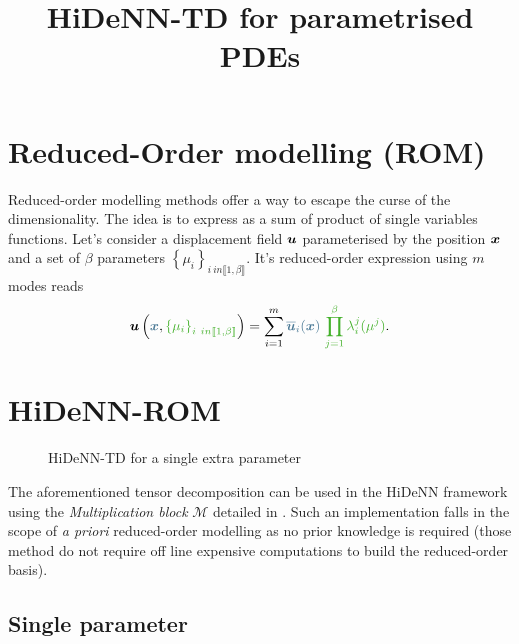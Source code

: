 \documentclass{article}
\author{}
\title{HiDeNN-TD for parametrised PDEs}
\date{}
\begin{document}
\maketitle

\section{Reduced-Order modelling (ROM)}

    Reduced-order modelling methods offer a way to escape the curse of the dimensionality. The idea is to express as a sum of product of single variables functions. Let's consider a displacement field $\boldsymbol{u}$ parameterised by the position $\boldsymbol{x}$ and a set of $\beta$ parameters $\left\{\mu_i\right\}_{i \ in \llbracket 1, \beta \rrbracket}$. It's reduced-order expression using $m$ modes reads
    \begin{equation}
        \vect{u}\left(\textcolor{BleuLMS!70}{\vect{x}}, \textcolor{LGreenLMS}{\left\{\mu_i\right\}_{i \ in \llbracket 1, \beta \rrbracket}}\right) = \sum\limits_{i=1}^m \textcolor{BleuLMS!70}{\overline{\vect{u}}_i(\vect{x})} ~\textcolor{LGreenLMS}{\prod_{j=1}^{\beta}\lambda_i^j(\mu^j)}.
    \end{equation}

\section{HiDeNN-ROM}


\begin{wrapfigure}{r}{0.45\textwidth}
    \flushleft
    
    \caption{HiDeNN-TD for a single extra parameter}
    \label{fig:HiDeNN_TD_mu}
\end{wrapfigure}
The aforementioned tensor decomposition can be used in the HiDeNN framework \parencite{zhang_hidenn-td_2022} using the \emph{Multiplication block} $\mathcal{M}$ detailed in \parencite{zhang_hierarchical_2021}. Such an implementation falls in the scope of \emph{a priori} reduced-order modelling \parencite{ryckelynck_thea_2006,chinesta_short_2011} as no prior knowledge is required (those method do not require off line expensive computations to build the reduced-order basis).

\subsection{Single parameter}
\end{document}
